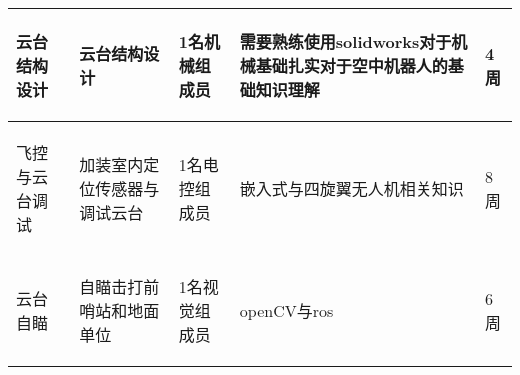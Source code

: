 \begin{longtable}{ p{2cm} | p{3cm} | p{3cm} | p{4.8cm} | p{2cm} |}
    \hline
        \begin{center}
            云台结构设计
        \end{center} &
        \begin{center}
            云台结构设计
        \end{center} &
        \begin{center}
            1名机械组成员
        \end{center} &
        \begin{center}
            需要熟练使用solidworks对于机械基础扎实对于空中机器人的基础知识理解
        \end{center} &
        \begin{center}
            4周
        \end{center}\\

    \hline
    
        \begin{center}
            飞控与云台调试
        \end{center} &
        \begin{center}
            加装室内定位传感器与调试云台
        \end{center} &
        \begin{center}
            1名电控组成员
        \end{center} &
        \begin{center}
            嵌入式与四旋翼无人机相关知识
        \end{center} &
        \begin{center}
            8周
        \end{center} \\
        
    \hline
    
        \begin{center}
            云台自瞄
        \end{center} &
        \begin{center}
            自瞄击打前哨站和地面单位
        \end{center} &
        \begin{center}
            1名视觉组成员
        \end{center} &
        \begin{center}
            openCV与ros
        \end{center} &
        \begin{center}
            6周
        \end{center}\\


\end{longtable}
